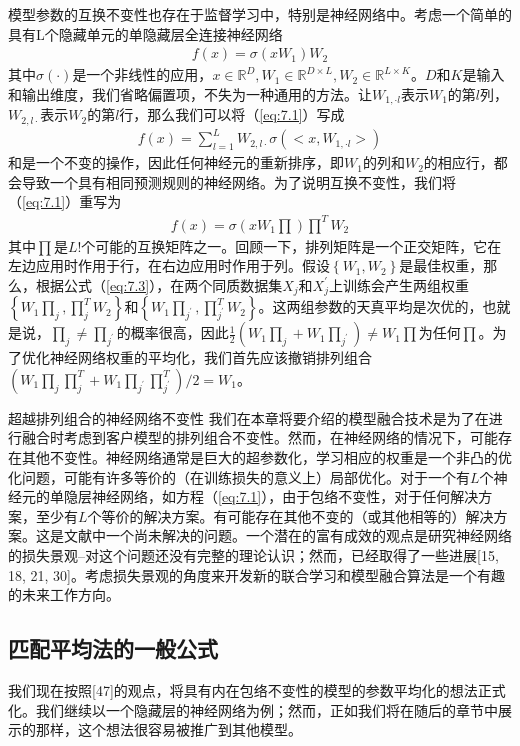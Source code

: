 模型参数的互换不变性也存在于监督学习中，特别是神经网络中。考虑一个简单的具有L个隐藏单元的单隐藏层全连接神经网络
\begin{align}\label{eq:7.1}
	f(x) = \sigma (x W_{1}) W_{2}
\end{align}
其中$\sigma(\cdot)$是一个非线性的应用，$x \in \mathbb{R}^{D}, W_{1} \in \mathbb{R}^{D \times L}, W_{2} \in \mathbb{R}^{L \times K}$。$D$和$K$是输入和输出维度，我们省略偏置项，不失为一种通用的方法。让$W_{1, \cdot l}$表示$W_{1}$的第$l$列，$W_{2, l \cdot}$表示$W_{2}$的第$l$行，那么我们可以将（\ref{eq:7.1}）写成
\begin{align}\label{eq:7.2}
	f(x) = \sum_{l=1}^{L}W_{2, l \cdot} \sigma(<x, W_{1, \cdot l}>)
\end{align}
和是一个不变的操作，因此任何神经元的重新排序，即$W_{1}$的列和$W_{2}$的相应行，都会导致一个具有相同预测规则的神经网络。为了说明互换不变性，我们将（\ref{eq:7.1}）重写为
\begin{align}\label{eq:7.3}
	f(x) = \sigma (x W_{1} \prod) \prod^{T}W_{2}
\end{align}
其中$\prod$是$L!$个可能的互换矩阵之一。回顾一下，排列矩阵是一个正交矩阵，它在左边应用时作用于行，在右边应用时作用于列。假设$\left\{ W_{1}, W_{2} \right\}$是最佳权重，那么，根据公式（\ref{eq:7.3}），在两个同质数据集$X_{j}$和$X_{j}^{'}$上训练会产生两组权重$\left\{ W_{1}\prod_{j}, \prod_{j}^{T}W_{2} \right\}$和$\left\{ W_{1}\prod_{j^{'}}, \prod_{j^{'}}^{T}W_{2} \right\}$。这两组参数的天真平均是次优的，也就是说，$\prod_{j} \neq \prod_{j^{'}}$的概率很高，因此$\frac{1}{2}(W_{1}\prod_{j} + W_{1}\prod_{j^{'}}) \neq W_{1}\prod$为任何$\prod$。为了优化神经网络权重的平均化，我们首先应该撤销排列组合$(W_{1}\prod_{j}\prod_{j}^{T} + W_{1}\prod_{j^{'}}\prod_{j^{'}}^{T})/2 = W_{1}$。

超越排列组合的神经网络不变性
我们在本章将要介绍的模型融合技术是为了在进行融合时考虑到客户模型的排列组合不变性。然而，在神经网络的情况下，可能存在其他不变性。神经网络通常是巨大的超参数化，学习相应的权重是一个非凸的优化问题，可能有许多等价的（在训练损失的意义上）局部优化。对于一个有$L$个神经元的单隐层神经网络，如方程（\ref{eq:7.1}），由于包络不变性，对于任何解决方案，至少有$L$个等价的解决方案。有可能存在其他不变的（或其他相等的）解决方案。这是文献中一个尚未解决的问题。一个潜在的富有成效的观点是研究神经网络的损失景观--对这个问题还没有完整的理论认识；然而，已经取得了一些进展[15, 18, 21, 30]。考虑损失景观的角度来开发新的联合学习和模型融合算法是一个有趣的未来工作方向。

\subsection{匹配平均法的一般公式}
我们现在按照[47]的观点，将具有内在包络不变性的模型的参数平均化的想法正式化。我们继续以一个隐藏层的神经网络为例；然而，正如我们将在随后的章节中展示的那样，这个想法很容易被推广到其他模型。

